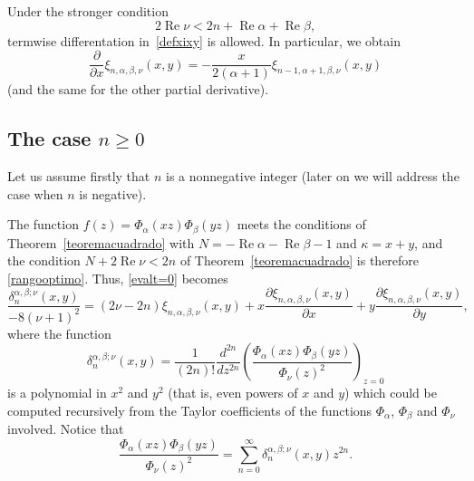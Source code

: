 \documentclass[10pt,leqno,a4paper]{article}
\theoremstyle{plain}
\renewcommand{\Re}{\operatorname{Re}}
\numberwithin{equation}{section}
\begin{document}
Under the stronger condition
\begin{equation}
\label{rangopeq2v}
   2\Re \nu < 2n + \Re \alpha + \Re \beta,
\end{equation}
termwise differentation in~\eqref{defxixy} is allowed. In particular, we obtain
\begin{equation}
\label{ec:parcialxi}
   \frac{\partial}{\partial x} \xi_{n,\alpha,\beta,\nu}(x,y)
   = - \frac{x}{2(\alpha+1)} \xi_{n-1,\alpha+1,\beta,\nu}(x,y)
\end{equation}
(and the same for the other partial derivative).

\subsection{The case $n\geq 0$}

Let us assume firstly that $n$ is a nonnegative integer (later on we will address the case when $n$ is negative).

The function $f(z) = \Phi_{\alpha}(xz) \Phi_{\beta}(yz)$ meets the conditions of Theorem~\ref{teoremacuadrado} with $N=-\Re \alpha - \Re \beta -1$ and $\kappa = x + y$, and the condition $N + 2 \Re \nu < 2n$ of Theorem~\ref{teoremacuadrado} is therefore \eqref{rangooptimo}. Thus, \eqref{evalt=0} becomes
\begin{equation}
\label{eddp}
   \frac{\delta_n^{\alpha,\beta;\nu}(x,y)}{-8(\nu+1)^2}
   = (2\nu-2n) \xi_{n,\alpha,\beta,\nu}(x,y)
   + x \frac{\partial \xi_{n,\alpha,\beta,\nu} (x,y)}{\partial x}
   + y \frac{\partial \xi_{n,\alpha,\beta,\nu} (x,y)}{\partial y},
\end{equation}
where the function
\begin{equation}
\label{eb1}
   \delta_n^{\alpha,\beta;\nu}(x,y) = \frac{1}{(2n)!}
   \frac{d^{2n}}{dz^{2n}}
   \left( \frac{\Phi_{\alpha}(xz)\Phi_{\beta}(yz)}{\Phi_\nu(z)^2} \right)_{z=0}
\end{equation}
is a polynomial in $x^2$ and $y^2$ (that is, even powers of $x$ and $y$) which could be computed recursively from the Taylor coefficients of the functions $\Phi_{\alpha}$, $\Phi_\beta$ and $\Phi_\nu$ involved. Notice that
\begin{equation}
\label{jodr}
   \frac{\Phi_\alpha(xz)\Phi_\beta(yz)}{\Phi_\nu(z)^2}
   = \sum_{n=0}^\infty \delta_n^{\alpha,\beta;\nu}(x,y)z^{2n}.
\end{equation}
\end{document}
